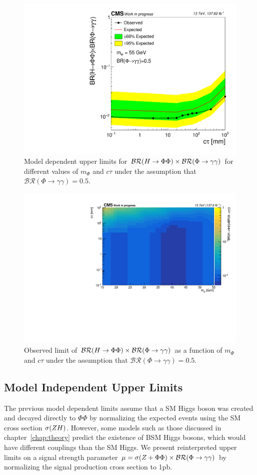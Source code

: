\begin{figure}[H]
	\includegraphics[width=0.4\linewidth]{figs/05_analysis/limitVsCtau_ZH_m55_Run2.pdf}
	\caption[Model dependent upper limits for $\mathcal{BR} (\VH \to \Phi\Phi)\times\mathcal{BR} (\Phi \to \gamma\gamma)$ for different values of $m_\Phi$ and $c\tau$ under the assumption that $\mathcal{BR} (\Phi \to \gamma\gamma) =0.5$.]{Model dependent upper limits for $\mathcal{BR} (\VH \to \Phi\Phi)\times\mathcal{BR} (\Phi \to \gamma\gamma)$ for different values of $m_\Phi$ and $c\tau$ under the assumption that $\mathcal{BR} (\Phi \to \gamma\gamma) =0.5$.}
	\label{fig:limits_MD_1D}
\end{figure}

\begin{figure}[htb!]
	\centering
	\includegraphics[width=0.75\linewidth]{figs/05_analysis/obs_2D_mVsCtau_ZH_Run2.pdf}
	\caption[Observed limit of $\mathcal{BR} (\VH \to \Phi\Phi)\times\mathcal{BR} (\Phi \to \gamma\gamma)$ as a function of $m_\Phi$ and $c\tau$ under the assumption that $\mathcal{BR} (\Phi \to \gamma\gamma) =0.5$.] {Observed limit of $\mathcal{BR} (\VH \to \Phi\Phi)\times\mathcal{BR} (\Phi \to \gamma\gamma)$ as a function of $m_\Phi$ and $c\tau$ under the assumption that $\mathcal{BR} (\Phi \to \gamma\gamma) =0.5$.}
	\label{fig:limits_MD_2D}
\end{figure}


\subsection{Model Independent Upper Limits} \label{sec:ana_modelindepUL}
The previous model dependent limits assume that a SM Higgs boson was created and decayed directly to $\Phi\Phi$ by normalizing the expected events using the SM cross section $\sigma(ZH)$. However, some models such as those discussed in chapter~\ref{chap:theory} predict the existence of BSM Higgs bosons, which would have different couplings than the SM Higgs. We present reinterpreted upper limits on a signal strength parameter $\mu=\sigma(Z+\Phi\Phi)\times\mathcal{BR}(\Phi\to\gamma\gamma)$ by normalizing the signal production cross section to 1\unit{pb}.

